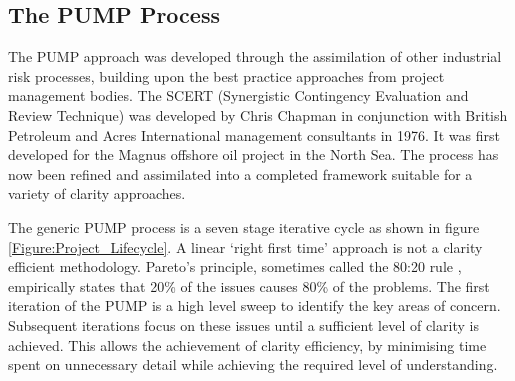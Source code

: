 \subsection{The PUMP Process}

The PUMP approach was developed through the assimilation of other industrial risk processes, building upon the best practice approaches from project management bodies.
The SCERT (Synergistic Contingency Evaluation and Review Technique) was developed by Chris Chapman in conjunction with British Petroleum and Acres International management consultants in 1976.
It was first developed for the Magnus offshore oil project in the North Sea. 
The process has now been refined and assimilated into a completed framework suitable for a variety of clarity approaches.

The generic PUMP process is a seven stage iterative cycle as shown in figure \ref{Figure:Project_Lifecycle}. 
A linear `right first time' approach is not a clarity efficient methodology.
Pareto's principle, sometimes called the 80:20 rule \citep{Pareto1992}, empirically states that 20\% of the issues causes 80\% of the problems. 
The first iteration of the PUMP is a high level sweep to identify the key areas of concern.
Subsequent iterations focus on these issues until a sufficient level of clarity is achieved.
This allows the achievement of clarity efficiency, by minimising time spent on unnecessary detail while achieving the required level of understanding.

